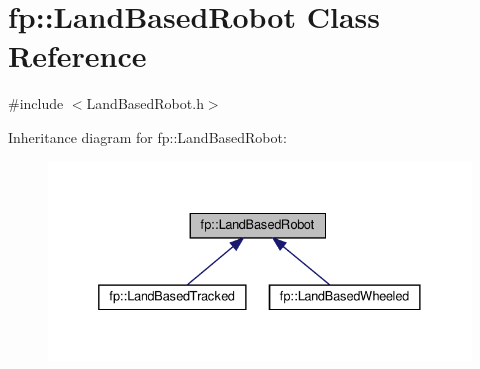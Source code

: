 \hypertarget{classfp_1_1_land_based_robot}{}\section{fp\+:\+:Land\+Based\+Robot Class Reference}
\label{classfp_1_1_land_based_robot}


{\ttfamily \#include $<$Land\+Based\+Robot.\+h$>$}



Inheritance diagram for fp\+:\+:Land\+Based\+Robot\+:\nopagebreak
\begin{figure}[H]
\begin{center}
\leavevmode
\includegraphics[width=332pt]{classfp_1_1_land_based_robot__inherit__graph}
\end{center}
\end{figure}

